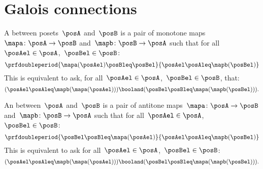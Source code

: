 

\section{Galois connections}\label{subsec:galois-connections}

\begin{ctdefinition}
    A \emph{} between posets~$\posA$ and~$\posB$ is a pair of monotone maps~$\mapa\colon \posA\to \posB$ and~$\mapb\colon \posB\to \posA$ such that for all~$\posAel\in \posA$,~$\posBel\in \posB$:
    \begin{equation}
        \prfdoubleperiod{\mapa(\posAel) \posBleq \posBel}{\posAel \posAleq \mapb(\posBel)}
    \end{equation}
    This is equivalent to ask, for all~$\posAel\in \posA$,~$\posBel\in \posB$, that:
    \begin{equation}
        (\posAel\posAleq \mapb(\mapa(\posAel)))
        \booland (\posBel\posBleq \mapa(\mapb(\posBel))).
    \end{equation}
\end{ctdefinition}

\begin{ctdefinition}
    An \emph{} between~$\posA$ and~$\posB$ is a pair of antitone maps~$\mapa\colon \posA\to \posB$ and~$\mapb \colon \posB\to \posA$ such that for all~$\posAel\in \posA$,~$\posBel\in \posB$:
    \begin{equation}
        \prfdoubleperiod{\posBel \posBleq \mapa(\posAel)}{\posAel \posAleq \mapb(\posBel)}
    \end{equation}
    This is equivalent to ask for all~$\posAel\in \posA$,~$\posBel\in \posB$:
    \begin{equation}
        (\posAel \posAleq \mapb(\mapa(\posAel)))
        \booland  (\posBel \posBleq \mapa(\mapb(\posBel))).
    \end{equation}
\end{ctdefinition}

